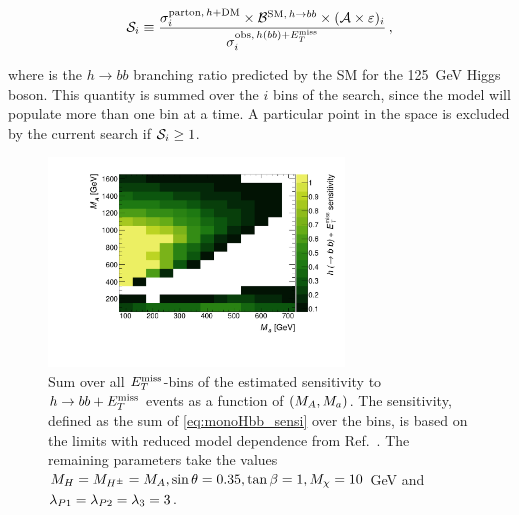 \begin{equation}
\label{eq:monoHbb_sensi}
\mathcal{S}_i \equiv \frac{\sigma_{i}^{\mathrm{parton},\,h+\textrm{DM}} \times \mathcal{B}^{\mathrm{SM},\,h\to bb} \times (\mathcal{A\times\varepsilon})_{i} }
{\sigma_{i}^{\mathrm{obs},\,h(bb)+E_T^\mathrm{miss}}}\,,
\end{equation}

where  is the $h\to bb$ branching ratio predicted by the SM for the 125~GeV Higgs boson. This quantity is summed over the $i$ \met bins of the search, since the model will populate more than one \met bin at a time. A particular point in the space is excluded by the current search if $\mathcal{S}_i \geq 1$. 

\begin{figure}[tbp]
\centering
\includegraphics[width=0.7\textwidth]{texinputs/04_grid/figures/monoHbb_sensi_sum_bins_1_2_3_4_ma_vs_mA_lin.pdf}
\caption[Sensitivity to $h\to bb + \MET$ signals in $\mA$ - $\ma$ plane, summed across $\MET$ bins]
{
Sum over all $\MET$-bins of the estimated sensitivity to $h\to bb + \MET$ events as a function of $(M_{A},M_{a})$. 
The sensitivity, defined as the sum of \autoref{eq:monoHbb_sensi} over the \met bins, is based on the limits with reduced model dependence from Ref.~\cite{Aaboud:2017yqz}. 
The remaining parameters take the values $ M_{H}=M_{H^{\pm}}= M_{A}, \sin\theta = 0.35, \tan\beta = 1, M_{\chi} = 10$ GeV and $ \lambda_{P1} = \lambda_{P2} = \lambda_{3} = 3 $.}
\label{fig:monoHbb_sensi_full_mA_ma}
\end{figure}

